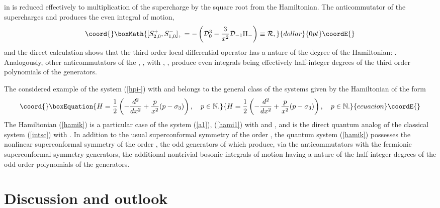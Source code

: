 \documentclass[a4paper,12pt]{article}
\def\N{\mathbb N}
\begin{document}
in \coordHE{} is reduced effectively to multiplication of
the supercharge \coordHE{} by the square root from the
Hamiltonian.
The anticommutator of the supercharges \coordHE{} and
\coordHE{} produces the even integral of motion,
$$\coord{}\boxMath{
[S^+_{2,0},S^-_{1,0}]_{{}_+}=
-\left({\cal D}_0^3-\frac{3}{x^2}{\cal D}_{-1}\Pi_-\right)
\equiv {\cal R},
}{dollar}{0pt}\coordE{}$$
and the direct calculation
shows that the third order local differential operator
\coordHE{} has a nature of the \coordHE{} degree of the
Hamiltonian:
\coordHE{}.
Analogously, other anticommutators
of the \coordHE{}, \coordHE{},
with \coordHE{}, \coordHE{},
produce even integrals being effectively
half-integer degrees of the
third order polynomials
of the \coordHE{} generators.

The considered example of the system (\ref{hpi-})
with \coordHE{} and \coordHE{} belongs to the general class of the
systems given by the Hamiltonian of the form
\begin{equation}\coord{}\boxEquation{
H=\frac{1}{2}\left(-\frac{d^2}{dx^2}+\frac{p}
{x^2}(p- \sigma_3)\right),\quad
p\in \N.
\label{hamik}
}{
H=\frac{1}{2}\left(-\frac{d^2}{dx^2}+\frac{p}
{x^2}(p- \sigma_3)\right),\quad
p\in \N.
}{ecuacion}\coordE{}\end{equation}
The Hamiltonian (\ref{hamik}) is a particular case
of the system (\ref{a1}), (\ref{hami1})
with \coordHE{} and \coordHE{},
and is the direct quantum analog
of the classical system (\ref{intsc})
with \coordHE{}.
In addition
to the usual superconformal symmetry
of the order \coordHE{}, the quantum system
(\ref{hamik}) possesses the nonlinear
superconformal symmetry of the order \coordHE{},
the odd generators of which produce,
via the anticommutators with the
fermionic \coordHE{} superconformal symmetry generators,
the additional nontrivial
bosonic integrals of motion having a
nature of the half-integer degrees
of the
odd order polynomials
of the
\coordHE{} generators.


\section{Discussion and outlook}
\end{document}
